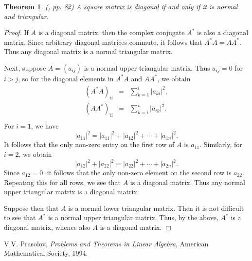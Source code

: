 \documentclass[12pt]{article}
\begin{document}
\newtheorem{thm}{Theorem}
\begin{thm}
 (\cite{prasolov}, pp. 82) 
A square matrix is diagonal
if and only if it is normal and triangular. 
\end{thm}

\emph{Proof.} If $A$ is a diagonal matrix, then the complex conjugate 
$A^\ast$ is also a diagonal matrix. Since arbitrary diagonal matrices
commute, it follows that $A^\ast A = A A^\ast$. 
Thus
any diagonal matrix is a normal triangular matrix. 

Next, suppose $A=(a_{ij})$ is a normal upper triangular matrix. 
Thus $a_{ij}=0$ for $i>j$, so for the diagonal elements in $A^\ast A$ and
$AA^\ast$, we obtain
\begin{eqnarray*}
(A^\ast A)_{ii} &=& \sum_{k=1}^i |a_{ki}|^2, \\
(AA^\ast)_{ii} &=& \sum_{k=i}^n |a_{ik}|^2. \\
\end{eqnarray*}
For $i=1$, we have
$$ |a_{11}|^2 = |a_{11}|^2+|a_{12}|^2+\cdots + |a_{1n}|^2.$$
It follows that the only non-zero entry on the first row of $A$ is $a_{11}$.
Similarly, for $i=2$, we obtain
$$ |a_{12}|^2 + |a_{22}|^2 = |a_{22}|^2+\cdots + |a_{2n}|^2.$$
Since $a_{12}=0$, it follows that the only non-zero element on the
second row is $a_{22}$. Repeating this  for all rows, 
we see that $A$ is a diagonal matrix. Thus any normal 
upper triangular matrix is a diagonal matrix. 

Suppose then that $A$ is a normal lower triangular matrix. 
Then it is not difficult to see that $A^\ast$ is a normal 
upper triangular matrix. Thus, by the above, $A^\ast$ is a diagonal matrix,
whence also $A$ is a diagonal matrix. $\Box$


\begin{thebibliography}{9}
 V.V. Prasolov, 
\emph{Problems and Theorems in Linear Algebra}, 
American Mathematical Society, 1994.
 \end{thebibliography}
\end{document}
